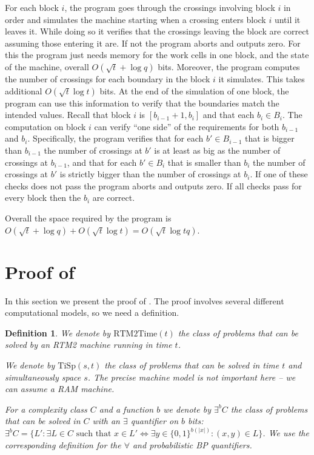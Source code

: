 \documentclass{toc}
\newtheorem{defn}[theorem]{Definition}
\newcommand{\zo}{\{0, 1\}}
\newcommand{\TiSp}[2]{\ensuremath{\mathrm{TiSp} \left(#1,#2 \right)}}
\newcommand{\RTMTime}[1]{\ensuremath{\mathrm{RTM2Time} \left( #1 \right)}}
\begin{document}
For each block $i$, the program goes through the crossings involving
block $i$ in order and simulates the machine starting when a crossing
enters block $i$ until it leaves it. While doing so it verifies that
the crossings leaving the block are correct assuming those entering
it are. If not the program aborts and outputs zero. For this the program
just needs memory for the work cells in one block, and the state of
the machine, overall $O(\sqrt{t}+\log q)$ bits. Moreover, the program
computes the number of crossings for each boundary in the block $i$
it simulates. This takes additional $O(\sqrt{t}\log t)$ bits. At
the end of the simulation of one block, the program can use this information
to verify that the boundaries match the intended values. Recall that
block $i$ is $[b_{i-1}+1,b_{i}]$ and that each $b_{i}\in B_{i}$.
The computation on block $i$ can verify ``one side'' of the requirements
for both $b_{i-1}$ and $b_{i}$. Specifically, the program verifies
that for each $b'\in B_{i-1}$ that is bigger than $b_{i-1}$ the
number of crossings at $b'$ is at least as big as the number of crossings
at $b_{i-1}$, and that for each $b'\in B_{i}$ that is smaller than
$b_{i}$ the number of crossings at $b'$ is strictly bigger than
the number of crossings at $b_{i}$. If one of these checks does not
pass the program aborts and outputs zero. If all checks pass for every
block then the $b_{i}$ are correct.

Overall the space required by the program is $O(\sqrt{t}+\log q)+O(\sqrt{t}\log t)=O(\sqrt{t}\log tq)$.

\section{Proof of  \label{sec:Proof-of-lower-bound}}
%

In this section we present the proof of .
The proof involves several different computational models, so we need
a definition.
\begin{defn}
We denote by $\RTMTime{t}$ the class of problems that can be solved
by an RTM2 machine running in time $t$.

We denote by $\TiSp{s}{t}$ the class of problems that can be solved
in time $t$ and simultaneously space $s$. The precise machine model
is not important here -- we can assume a RAM machine.

For a complexity class $C$ and a function $b$ we denote by $\exists^{b}C$
the class of problems that can be solved in $C$ with an $\exists$
quantifier on $b$ bits: $\exists^{b}C=\{L':\exists L\in C\text{ such that }x\in L'\Leftrightarrow\exists y\in\zo^{b(|x|)}:(x,y)\in L\}$.
We use the corresponding definition for the $\forall$ and probabilistic
BP quantifiers.
\end{defn}
\end{document}
